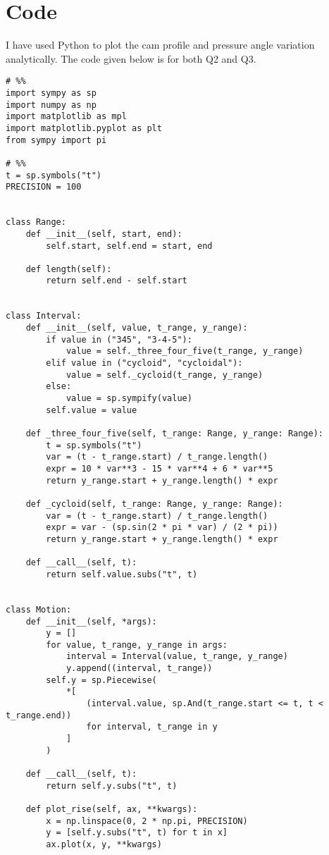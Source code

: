 \documentclass[12pt]{article}
\begin{document}
\section{Code}

I have used Python to plot the cam profile and pressure angle variation analytically. The code given below is for both Q2 and Q3.

\begin{lstlisting}
# %%
import sympy as sp
import numpy as np
import matplotlib as mpl
import matplotlib.pyplot as plt
from sympy import pi

# %%
t = sp.symbols("t")
PRECISION = 100


class Range:
    def __init__(self, start, end):
        self.start, self.end = start, end

    def length(self):
        return self.end - self.start


class Interval:
    def __init__(self, value, t_range, y_range):
        if value in ("345", "3-4-5"):
            value = self._three_four_five(t_range, y_range)
        elif value in ("cycloid", "cycloidal"):
            value = self._cycloid(t_range, y_range)
        else:
            value = sp.sympify(value)
        self.value = value

    def _three_four_five(self, t_range: Range, y_range: Range):
        t = sp.symbols("t")
        var = (t - t_range.start) / t_range.length()
        expr = 10 * var**3 - 15 * var**4 + 6 * var**5
        return y_range.start + y_range.length() * expr

    def _cycloid(self, t_range: Range, y_range: Range):
        var = (t - t_range.start) / t_range.length()
        expr = var - (sp.sin(2 * pi * var) / (2 * pi))
        return y_range.start + y_range.length() * expr

    def __call__(self, t):
        return self.value.subs("t", t)


class Motion:
    def __init__(self, *args):
        y = []
        for value, t_range, y_range in args:
            interval = Interval(value, t_range, y_range)
            y.append((interval, t_range))
        self.y = sp.Piecewise(
            *[
                (interval.value, sp.And(t_range.start <= t, t < t_range.end))
                for interval, t_range in y
            ]
        )

    def __call__(self, t):
        return self.y.subs("t", t)

    def plot_rise(self, ax, **kwargs):
        x = np.linspace(0, 2 * np.pi, PRECISION)
        y = [self.y.subs("t", t) for t in x]
        ax.plot(x, y, **kwargs)


\end{lstlisting}
\end{document}
